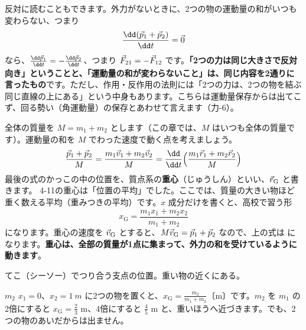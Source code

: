 \label{ph:力-3:sayou}反対に読むこともできます。外力がないときに、2つの物の運動量の和がいつも変わらない、つまり
\[\frac{\dd(\pxdv p_1+\pxdv p_2)}{\dd t}=\pxdv 0\]
なら、$\tfrac{\dd\pxdv p_1}{\dd t}=-\tfrac{\dd\pxdv p_2}{\dd t}$、つまり $\vec{F}_{21}=-\vec{F}_{12}$ です。\textbf{「2つの力は同じ大きさで反対向き」ということと、「運動量の和が変わらないこと」は、同じ内容を2通りに言ったもの}です。ただし、作用・反作用の法則には「2つの力は、2つの物を結ぶ同じ直線の上にある」という中身もあります。こちらは運動量保存からは出てこず、回る勢い（角運動量）の保存とあわせて言えます（力-6）。

全体の質量を $M=m_1+m_2$ とします（この章では、$M$ はいつも全体の質量です）。運動量の和を $M$ でわった速度で動く点を考えましょう。
\[\frac{\pxdv p_1+\pxdv p_2}{M}=\frac{m_1\pxdv v_1+m_2\pxdv v_2}{M}=\frac{\dd}{\dd t}\Bigl(\frac{m_1\pxdv r_1+m_2\pxdv r_2}{M}\Bigr)\]
最後の式のかっこの中の位置を、質点系の\textbf{重心}（じゅうしん）といい、$\vec{r}_{\mathrm G}$ と書きます。
\label{ph:力-3:juushin}4-11の重心は「位置の平均」でした。ここでは、質量の大きい物ほど重く数える平均（重みつきの平均）です。$x$ 成分だけを書くと、高校で習う形
\[x_{\mathrm G}=\frac{m_1x_1+m_2x_2}{m_1+m_2}\]
になります。重心の速度を $\vec{v}_{\mathrm G}$ とすると、$M\vec{v}_{\mathrm G}=\vec{p}_1+\vec{p}_2$ なので、上の式は
になります。\textbf{重心は、全部の質量が1点に集まって、外力の和を受けているように動きます}。

\begin{phyomi}[$x_{\mathrm G}=\dfrac{m_1x_1+m_2x_2}{m_1+m_2}$]
てこ（シーソー）でつり合う支点の位置。重い物の近くにある。
\end{phyomi}

\begin{phbaisuru}{$m_2$}
$x_1=0$、$x_2=\qty{1}{m}$ に2つの物を置くと、$x_{\mathrm G}=\tfrac{m_2}{m_1+m_2}$〔m〕です。$m_2$ を $m_1$ の2倍にすると $x_{\mathrm G}=\tfrac{2}{3}$ m、4倍にすると $\tfrac{4}{5}$ m と、重いほうへ近づきます。でも、2つの物のあいだからは出ません。
\par\smallskip\noindent{}
\end{phbaisuru}

